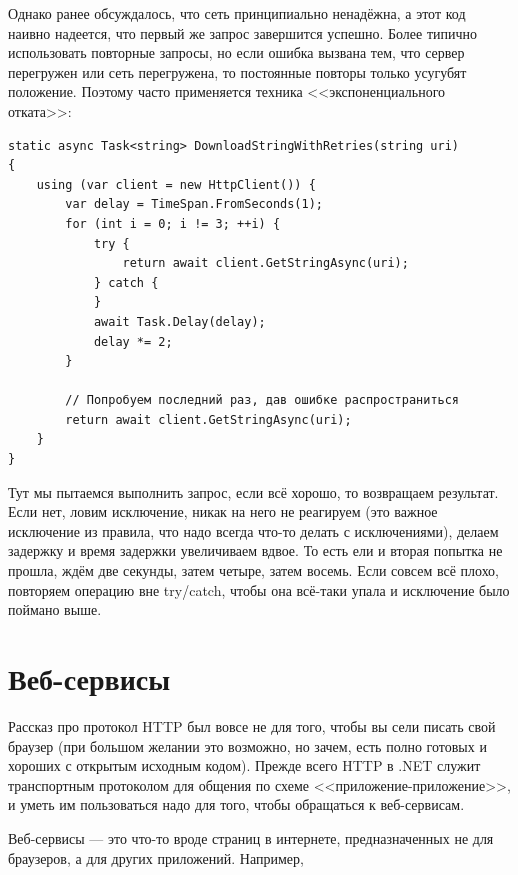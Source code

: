\documentclass[a5paper]{article}
\begin{document}
Однако ранее обсуждалось, что сеть принципиально ненадёжна, а этот код наивно надеется, что первый же запрос завершится успешно. Более типично использовать повторные запросы, но если ошибка вызвана тем, что сервер перегружен или сеть перегружена, то постоянные повторы только усугубят положение. Поэтому часто применяется техника <<экспоненциального отката>>:

\begin{verbatim}
static async Task<string> DownloadStringWithRetries(string uri)
{
    using (var client = new HttpClient()) {
        var delay = TimeSpan.FromSeconds(1);
        for (int i = 0; i != 3; ++i) {
            try {
                return await client.GetStringAsync(uri);
            } catch {
            }
            await Task.Delay(delay);
            delay *= 2;
        }

        // Попробуем последний раз, дав ошибке распространиться
        return await client.GetStringAsync(uri);
    }
}
\end{verbatim}

Тут мы пытаемся выполнить запрос, если всё хорошо, то возвращаем результат. Если нет, ловим исключение, никак на него не реагируем (это важное исключение из правила, что надо всегда что-то делать с исключениями), делаем задержку и время задержки увеличиваем вдвое. То есть ели и вторая попытка не прошла, ждём две секунды, затем четыре, затем восемь. Если совсем всё плохо, повторяем операцию вне try/catch, чтобы она всё-таки упала и исключение было поймано выше.

\section{Веб-сервисы}

Рассказ про протокол HTTP был вовсе не для того, чтобы вы сели писать свой браузер (при большом желании это возможно, но зачем, есть полно готовых и хороших с открытым исходным кодом). Прежде всего HTTP в .NET служит транспортным протоколом для общения по схеме <<приложение-приложение>>, и уметь им пользоваться надо для того, чтобы обращаться к веб-сервисам.

Веб-сервисы --- это что-то вроде страниц в интернете, предназначенных не для браузеров, а для других приложений. Например,
\end{document}
